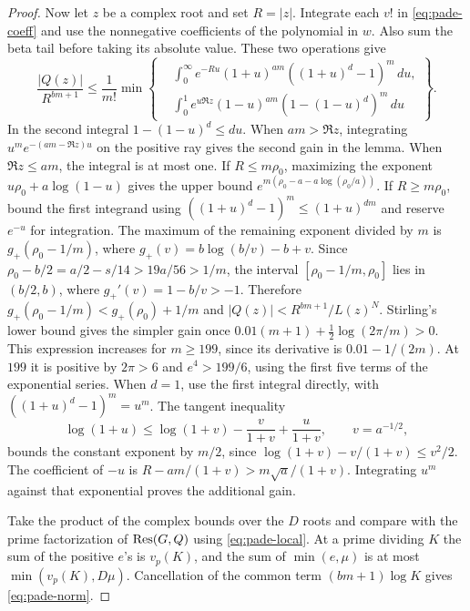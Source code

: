 \begin{proof}
Now let \(z\) be a complex root and set \(R=|z|\).
Integrate each \(v!\) in \eqref{eq:pade-coeff} and use
the nonnegative coefficients of the polynomial in \(w\).
Also sum the beta tail before taking its absolute value.
These two operations give
\begin{equation}\label{eq:pade-integrals}
 \frac{|Q(z)|}{R^{bm+1}}\le\frac1{m!}\min\left\{
 \begin{aligned}
 &\int_0^\infty e^{-Ru}(1+u)^{am}((1+u)^d-1)^m\,du,\\
 &\int_0^1 e^{u\Re z}(1-u)^{am}(1-(1-u)^d)^m\,du
 \end{aligned}\right\}.
\end{equation}
In the second integral \(1-(1-u)^d\le du\). When \(am>\Re z\),
integrating \(u^m e^{-(am-\Re z)u}\) on the positive ray gives
the second gain in the lemma. When \(\Re z\le am\), the integral
is at most one. If \(R\le m\rho_0\), maximizing the exponent
\(u\rho_0+a\log(1-u)\) gives the upper bound
\(e^{m(\rho_0-a-a\log(\rho_0/a))}\). If \(R\ge m\rho_0\),
bound the first integrand using \(((1+u)^d-1)^m\le(1+u)^{dm}\)
and reserve \(e^{-u}\) for integration. The maximum of the
remaining exponent divided by \(m\) is
\(g_+(\rho_0-1/m)\), where \(g_+(v)=b\log(b/v)-b+v\).
Since \(\rho_0-b/2=a/2-s/14>19a/56>1/m\), the interval
\([\rho_0-1/m,\rho_0]\) lies in \((b/2,b)\), where
\(g_+'(v)=1-b/v>-1\). Therefore
\(g_+(\rho_0-1/m)<g_+(\rho_0)+1/m\) and
\(|Q(z)|<R^{bm+1}/L(z)^N\).
Stirling's lower bound gives the simpler gain once
\(0.01(m+1)+\tfrac12\log(2\pi/m)>0\).
This expression increases for \(m\ge199\), since its derivative
is \(0.01-1/(2m)\). At \(199\) it is positive by \(2\pi>6\)
and \(e^4>199/6\), using the first five terms of the exponential series.
When \(d=1\), use the first integral directly, with
\(((1+u)^d-1)^m=u^m\). The tangent inequality
\[
 \log(1+u)\le \log(1+v)-\frac{v}{1+v}+\frac{u}{1+v},
 \qquad v=a^{-1/2},
\]
bounds the constant exponent by \(m/2\), since
\(\log(1+v)-v/(1+v)\le v^2/2\). The coefficient of
\(-u\) is \(R-am/(1+v)>m\sqrt a/(1+v)\). Integrating
\(u^m\) against that exponential proves the additional gain.

Take the product of the complex bounds over the \(D\) roots
and compare with the prime factorization of \(\operatorname{Res}(G,Q)\) using
\eqref{eq:pade-local}. At a prime dividing \(K\) the sum of the
positive \(e\)'s is \(v_p(K)\), and the sum of \(\min(e,\mu)\)
is at most \(\min(v_p(K),D\mu)\). Cancellation of the common
term \((bm+1)\log K\) gives \eqref{eq:pade-norm}.
\end{proof}

